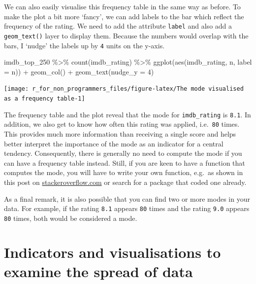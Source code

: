 \documentclass[
]{book}
\newenvironment{Shaded}{\begin{snugshade}}{\end{snugshade}}
\newcommand{\AttributeTok}[1]{\textcolor[rgb]{0.77,0.63,0.00}{#1}}
\newcommand{\DecValTok}[1]{\textcolor[rgb]{0.00,0.00,0.81}{#1}}
\newcommand{\FunctionTok}[1]{\textcolor[rgb]{0.00,0.00,0.00}{#1}}
\newcommand{\NormalTok}[1]{#1}
\newcommand{\SpecialCharTok}[1]{\textcolor[rgb]{0.00,0.00,0.00}{#1}}
\begin{document}
We can also easily visualise this frequency table in the same way as before. To make the plot a bit more `fancy', we can add labels to the bar which reflect the frequency of the rating. We need to add the attribute \texttt{label} and also add a \texttt{geom\_text()} layer to display them. Because the numbers would overlap with the bars, I `nudge' the labels up by \texttt{4} units on the y-axis.

\begin{Shaded}
\begin{Highlighting}[]
\NormalTok{imdb\_top\_250 }\SpecialCharTok{\%\textgreater{}\%}
  \FunctionTok{count}\NormalTok{(imdb\_rating) }\SpecialCharTok{\%\textgreater{}\%}
  \FunctionTok{ggplot}\NormalTok{(}\FunctionTok{aes}\NormalTok{(imdb\_rating, n, }\AttributeTok{label =}\NormalTok{ n)) }\SpecialCharTok{+}
  \FunctionTok{geom\_col}\NormalTok{() }\SpecialCharTok{+}
  \FunctionTok{geom\_text}\NormalTok{(}\AttributeTok{nudge\_y =} \DecValTok{4}\NormalTok{)}
\end{Highlighting}
\end{Shaded}

\begin{center}\texttt{[image: r\_for\_non\_programmers\_files/figure-latex/The mode visualised as a frequency table-1]} \end{center}

The frequency table and the plot reveal that the mode for \texttt{imdb\_rating} is \texttt{8.1}. In addition, we also get to know how often this rating was applied, i.e.~\texttt{80} times. This provides much more information than receiving a single score and helps better interpret the importance of the mode as an indicator for a central tendency. Consequently, there is generally no need to compute the mode if you can have a frequency table instead. Still, if you are keen to have a function that computes the mode, you will have to write your own function, e.g.~as shown in this post on \href{https://stackoverflow.com/questions/2547402/how-to-find-the-statistical-mode}{stackeroverflow.com} or search for a package that coded one already.

As a final remark, it is also possible that you can find two or more modes in your data. For example, if the rating \texttt{8.1} appears \texttt{80} times and the rating \texttt{9.0} appears \texttt{80} times, both would be considered a mode.

\hypertarget{spread-of-data}{%
\section{Indicators and visualisations to examine the spread of data}\label{spread-of-data}}
\end{document}
